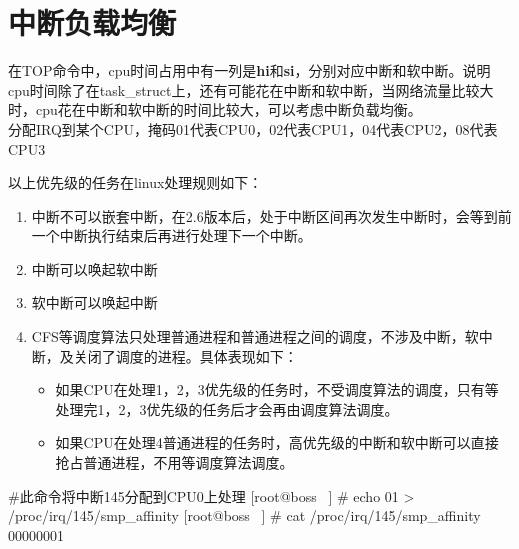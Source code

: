 \section{中断负载均衡}
在TOP命令中，cpu时间占用中有一列是\textbf{hi}和\textbf{si}，分别对应中断和软中断。说明cpu时间除了在task\_struct上，还有可能花在中断和软中断，当网络流量比较大时，cpu花在中断和软中断的时间比较大，可以考虑中断负载均衡。\\

分配IRQ到某个CPU，掩码01代表CPU0，02代表CPU1，04代表CPU2，08代表CPU3


以上优先级的任务在linux处理规则如下：

\begin{enumerate}
  \item 中断不可以嵌套中断，在2.6版本后，处于中断区间再次发生中断时，会等到前一个中断执行结束后再进行处理下一个中断。
  \item 中断可以唤起软中断
  \item 软中断可以唤起中断
  \item CFS等调度算法只处理普通进程和普通进程之间的调度，不涉及中断，软中断，及关闭了调度的进程。具体表现如下：\begin{itemize}
        \item 如果CPU在处理1，2，3优先级的任务时，不受调度算法的调度，只有等处理完1，2，3优先级的任务后才会再由调度算法调度。
        \item 如果CPU在处理4普通进程的任务时，高优先级的中断和软中断可以直接抢占普通进程，不用等调度算法调度。
        \end{itemize}
\end{enumerate}
\begin{latexcmd}[label= 中断分配到CPU方法]
#此命令将中断145分配到CPU0上处理
[root@boss ~] # echo 01 > /proc/irq/145/smp_affinity
[root@boss ~] # cat /proc/irq/145/smp_affinity
			00000001
\end{latexcmd}
